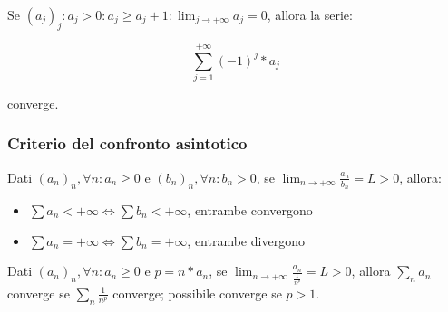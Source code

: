\documentclass{article}
\begin{document}
Se $(a_j)_j : a_j > 0 : a_j \geq a_j + 1 : \lim_{j \to +\infty} a_j = 0$, allora la serie:

$$
\sum_{j = 1}^{+\infty} (-1)^j * a_j
$$

\noindent
converge.

\subsubsection{Criterio del confronto asintotico}

Dati $(a_n)_n, \forall n : a_n \geq 0$ e $(b_n)_n, \forall n : b_n > 0$, se $\lim_{n \to +\infty} \frac{a_n}{b_n} = L > 0$, allora:

\begin{itemize}
    \item $\sum a_n < +\infty \Leftrightarrow \sum b_n < +\infty$, entrambe convergono
    \item $\sum a_n = +\infty \Leftrightarrow \sum b_n = +\infty$, entrambe divergono
\end{itemize}

\noindent
Dati $(a_n)_n, \forall n : a_n \geq 0$ e $p = n * a_n$, se $\lim_{n \to +\infty} \frac{a_n}{\frac{1}{n^p}} = L > 0$, allora $\sum_{n} a_n$ converge se $\sum_{n}^{} \frac{1}{n^p}$ converge; possibile converge se $p > 1$.
\end{document}
